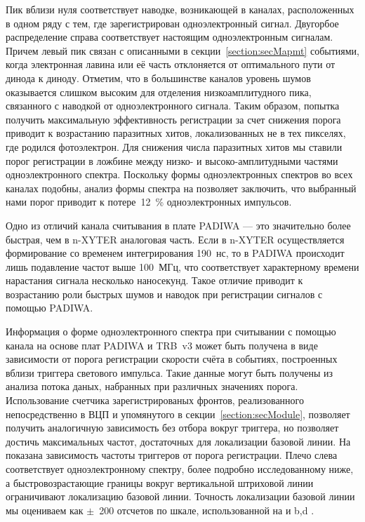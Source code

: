Пик вблизи нуля соответствует наводке, возникающей в каналах, расположенных в одном ряду с тем, где зарегистрирован одноэлектронный сигнал. Двугорбое распределение справа соответствует настоящим одноэлектронным сигналам. Причем левый пик связан с описанными в секции~\ref{section:secMapmt} событиями, когда электронная лавина или её часть отклоняется от оптимального пути от динода к диноду. Отметим, что в большинстве каналов уровень шумов оказывается слишком высоким для отделения низкоамплитудного пика, связанного с наводкой от одноэлектронного сигнала. Таким образом, попытка получить максимальную эффективность регистрации за счет снижения порога приводит к возрастанию паразитных хитов, локализованных не в тех пикселях, где родился фотоэлектрон. Для снижения числа паразитных хитов мы ставили порог регистрации в ложбине между низко- и высоко-амплитудными частями одноэлектронного спектра. Поскольку формы одноэлектронных спектров во всех каналах подобны, анализ формы спектра на  позволяет заключить, что выбранный нами порог приводит к потере~12~\% одноэлектронных импульсов.

Одно из отличий канала считывания в плате PADIWA --- это значительно более быстрая, чем в n-XYTER аналоговая часть. Если в n-XYTER осуществляется формирование со временем интегрирования 190~нс, то в PADIWA происходит лишь подавление частот выше 100~МГц, что соответствует характерному времени нарастания сигнала несколько наносекунд. Такое отличие приводит к возрастанию роли быстрых шумов и наводок при регистрации сигналов с помощью PADIWA.

Информация о форме одноэлектронного спектра при считывании с помощью канала на основе плат PADIWA и TRB~v3 может быть получена в виде зависимости от порога регистрации скорости счёта в событиях, построенных вблизи триггера светового импульса. Такие данные могут быть получены из анализа потока даных, набранных при различных значениях порога. Использование счетчика зарегистрированых фронтов, реализованного непосредственно в ВЦП и упомянутого в секции~\ref{section:secModule}, позволяет получить аналогичную зависимость без отбора вокруг триггера, но позволяет достичь максимальных частот, достаточных для локализации базовой линии. На  показана зависимость частоты триггеров от порога регистрации. Плечо слева соответствует одноэлектронному спектру, более подробно исследованному ниже, а быстровозрастающие границы вокруг вертикальной штриховой линии ограничивают локализацию базовой линии. Точность локализации базовой линии мы оцениваем как $ \pm $~200 отсчетов по шкале, использованной на  и b,d .

